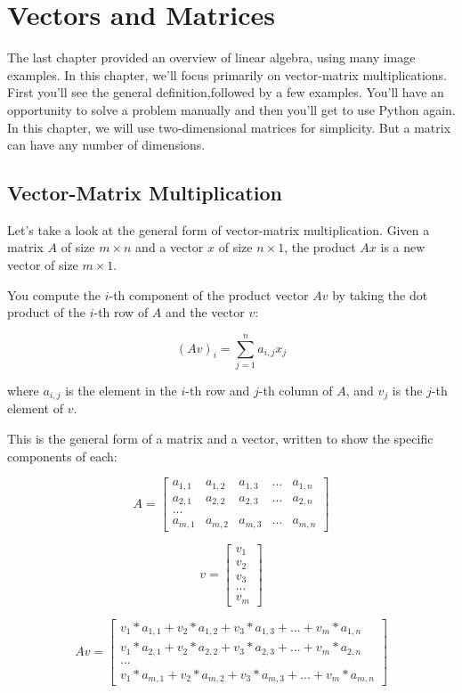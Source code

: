 \chapter{Vectors and Matrices}
  
The last chapter provided an overview of linear algebra, using many image examples. In this chapter, we'll focus primarily on vector-matrix multiplications. First you'll see the general definition,followed by a few examples. You'll have an opportunity to solve a problem manually and then you'll get to use Python again. In this chapter, we will use two-dimensional matrices for simplicity. But a matrix can have any number of dimensions.  

\section{Vector-Matrix Multiplication}
Let's take a look at the general form of vector-matrix multiplication. Given a matrix $A$ of size $m \times n$ and a vector $x$ of size $n \times 1$, the product $Ax$ is a new vector of size $m \times 1$. 

You compute the $i$-th component of the product vector $Av$ by taking the dot product of the $i$-th row of $A$ and the vector $v$:

$$(Av)_i = \sum_{j=1}^n a_{i,j}x_j$$

where $a_{i,j}$ is the element in the $i$-th row and $j$-th column of $A$, and $v_j$ is the $j$-th element of $v$.

This is the general form of a matrix and a vector, written to show the specific components of each:

 $$A = \begin{bmatrix}
 a_{1,1} & a_{1,2} & a_{1,3} & ... & a_{1,n}  \\
 a_{2,1} & a_{2,2} & a_{2,3} & ... & a_{2,n}  \\
 ... \\
 a_{m,1} & a_{m,2} & a_{m,3} & ... & a_{m,n}  
\end{bmatrix}$$

$$v = \begin{bmatrix}
 v_{1} \\
 v_{2} \\
 v_{3} \\
 ... \\
 v_{m} 
\end{bmatrix}$$

 $$Av =\begin{bmatrix}
 v_{1}*a_{1,1} +v_{2}*a_{1,2}  +v_{3}*a_{1,3} +... +v_{m}*a_{1,n}  \\
 v_{1}*a_{2,1} +v_{2}*a_{2,2}  +v_{3}*a_{2,3} +... +v_{m}*a_{2,n}  \\
 ... \\
 v_{1}*a_{m,1} +v_{2}*a_{m,2}  +v_{3}*a_{m,3} +... +v_{m}*a_{m,n}  
\end{bmatrix}$$

